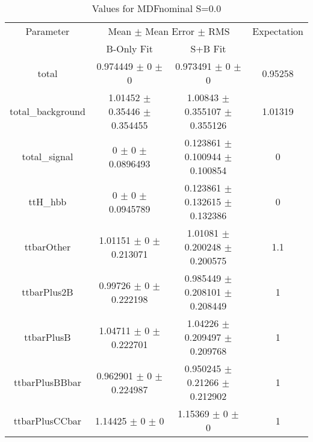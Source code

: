 \begin{table}
\centering
\caption{Values for MDFnominal S=0.0}
\begin{tabular}{cccc}
\toprule
Parameter & \multicolumn{2}{c}{Mean $\pm$ Mean Error $\pm$ RMS} & Expectation\\
 & B-Only Fit & S+B Fit & \\
\midrule
total & \num{0.974449} $\pm$ \num{0} $\pm$ \num{0} & \num{0.973491} $\pm$ \num{0} $\pm$ \num{0} & \num{0.95258}\\
total\_background & \num{1.01452} $\pm$ \num{0.35446} $\pm$ \num{0.354455} & \num{1.00843} $\pm$ \num{0.355107} $\pm$ \num{0.355126} & \num{1.01319}\\
total\_signal & \num{0} $\pm$ \num{0} $\pm$ \num{0.0896493} & \num{0.123861} $\pm$ \num{0.100944} $\pm$ \num{0.100854} & \num{0}\\
ttH\_hbb & \num{0} $\pm$ \num{0} $\pm$ \num{0.0945789} & \num{0.123861} $\pm$ \num{0.132615} $\pm$ \num{0.132386} & \num{0}\\
ttbarOther & \num{1.01151} $\pm$ \num{0} $\pm$ \num{0.213071} & \num{1.01081} $\pm$ \num{0.200248} $\pm$ \num{0.200575} & \num{1.1}\\
ttbarPlus2B & \num{0.99726} $\pm$ \num{0} $\pm$ \num{0.222198} & \num{0.985449} $\pm$ \num{0.208101} $\pm$ \num{0.208449} & \num{1}\\
ttbarPlusB & \num{1.04711} $\pm$ \num{0} $\pm$ \num{0.222701} & \num{1.04226} $\pm$ \num{0.209497} $\pm$ \num{0.209768} & \num{1}\\
ttbarPlusBBbar & \num{0.962901} $\pm$ \num{0} $\pm$ \num{0.224987} & \num{0.950245} $\pm$ \num{0.21266} $\pm$ \num{0.212902} & \num{1}\\
ttbarPlusCCbar & \num{1.14425} $\pm$ \num{0} $\pm$ \num{0} & \num{1.15369} $\pm$ \num{0} $\pm$ \num{0} & \num{1}\\
\bottomrule
\end{tabular}
\end{table}